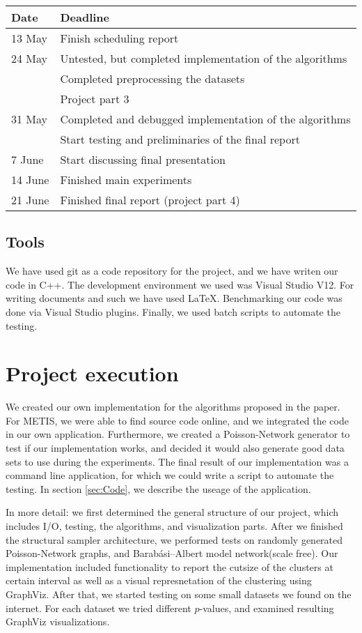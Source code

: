 \documentclass[a4paper]{article}
\begin{document}
\begin{tabular}{|l|l|}
\hline
\textbf{Date}	&	\textbf{Deadline}\\
\hline
13 May	&	Finish scheduling report\\
\hline
24 May	&	Untested, but completed implementation of the algorithms\\
		&	Completed preprocessing the datasets\\
		&	Project part 3 \\
\hline
31 May	&	Completed and debugged implementation of the algorithms\\
		& 	Start testing and preliminaries of the final report\\
\hline
7 June	&	Start discussing final presentation\\
\hline
14 June	&	Finished main experiments\\
\hline
21 June	&	Finished final report (project part 4)\\
\hline
\end{tabular}

\subsection{Tools} 
We have used git as a code repository for the project, and we have writen our code in C++. The development environment we used was Visual Studio V12. For writing documents and such we have used \LaTeX. Benchmarking our code was done via Visual Studio plugins. Finally, we used batch scripts to automate the testing.


\section{Project execution}\label{sec:PE}
We created our own implementation for the algorithms proposed in the paper. For METIS, we were able to find source code online, and we integrated the code in our own application. Furthermore, we created a Poisson-Network generator to test if our implementation works, and decided it would also generate good data sets to use during the experiments. The final result of our implementation was a command line application, for which we could write a script to automate the testing. In section \ref{sec:Code}, we describe the useage of the application. 

In more detail: we first determined the general structure of our project, which includes I/O, testing, the algorithms, and visualization parts. After we finished the structural sampler architecture, we performed tests on randomly generated Poisson-Network graphs, and Barabási–Albert model network(scale free). Our implementation included functionality to report the cutsize of the clusters at certain interval as well as a visual represnetation of the clustering using GraphViz. After that, we started testing on some small datasets we found on the internet. For each dataset we tried different $p$-values, and examined resulting GraphViz visualizations. 
\end{document}
